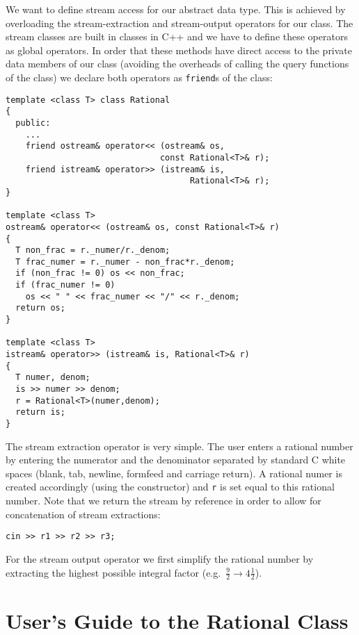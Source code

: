 We want to define stream access for our abstract data type.
This is achieved by overloading the stream-extraction and 
stream-output operators for our class. The stream classes
are built in classes in C++ and we have to define these
operators as global operators. In order that these methods
have direct access to the private data members of our class
(avoiding
the overheads of calling the query functions of the class)
we declare both operators as \verb+friend+s of the class:
{\footnotesize\begin{verbatim}
template <class T> class Rational
{
  public:
    ...
    friend ostream& operator<< (ostream& os,
                               const Rational<T>& r);
    friend istream& operator>> (istream& is,
                                     Rational<T>& r);
}

template <class T>
ostream& operator<< (ostream& os, const Rational<T>& r)
{
  T non_frac = r._numer/r._denom;
  T frac_numer = r._numer - non_frac*r._denom;
  if (non_frac != 0) os << non_frac;
  if (frac_numer != 0)
    os << " " << frac_numer << "/" << r._denom;
  return os;
}

template <class T>
istream& operator>> (istream& is, Rational<T>& r)
{
  T numer, denom;
  is >> numer >> denom;
  r = Rational<T>(numer,denom);
  return is;
}
\end{verbatim}}
The stream extraction operator is very simple. The user
enters a rational number by entering the numerator and
the denominator separated by standard C white spaces
(blank, tab, newline, formfeed and carriage return).
A rational numer is created accordingly (using the constructor)
and \verb+r+ is set equal to this rational number.
Note that we return the stream by reference in order
to allow for concatenation of stream extractions:
{\footnotesize\begin{verbatim}
cin >> r1 >> r2 >> r3;
\end{verbatim}}

For the stream output operator we first simplify the
rational number by extracting the highest possible integral 
factor (e.g.\ $\frac{9}{2} \longrightarrow 4 \frac{1}{2}$).


\section{User's Guide to the Rational Class 
            \label{secADTTemplatesDemonstration}}

